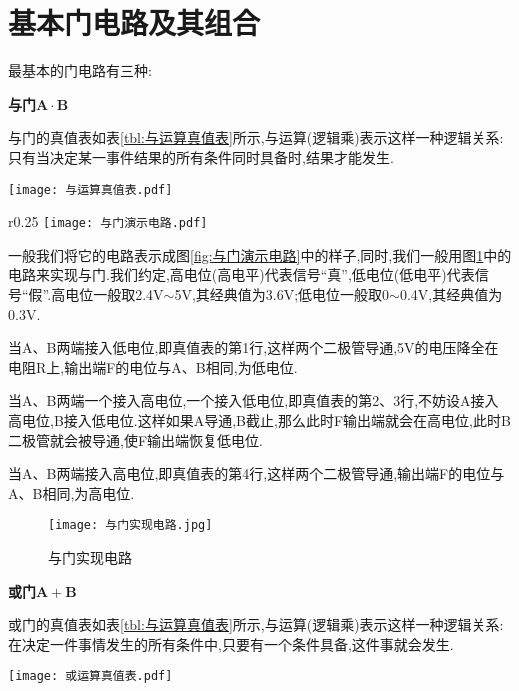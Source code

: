 \section{\K 基本门电路及其组合}
\Par 最基本的门电路有三种:

    \textbf{与门}$\boldsymbol{A}\cdot \boldsymbol{B}$
    
    \Par 与门的真值表如表\ref{tbl:与运算真值表}所示,与运算(逻辑乘)表示这样一种逻辑关系:只有当决定某一事件结果的所有条件同时具备时,结果才能发生.

    \begin{table}[htbp]
        \centering
        \caption{与运算真值表}
        \texttt{[image: 与运算真值表.pdf]}
        \label{tbl:与运算真值表}
    \end{table}

    \begin{wrapfigure}[5]{r}{0.25\textwidth}
        \centering
        \texttt{[image: 与门演示电路.pdf]}
        \caption{与门演示电路}
        \label{fig:与门演示电路}
    \end{wrapfigure}
    \Par 一般我们将它的电路表示成图\ref{fig:与门演示电路}中的样子,同时,我们一般用图\ref{fig:与门实现电路}中的电路来实现与门.我们约定,高电位(高电平)代表信号“真”,低电位(低电平)代表信号“假”.高电位一般取2.4V$\sim$5V,其经典值为3.6V;低电位一般取0$\sim$0.4V,其经典值为0.3V.

    \Par 当A、B两端接入低电位,即真值表的第1行,这样两个二极管导通,5V的电压降全在电阻R上,输出端F的电位与A、B相同,为低电位.

    \Par 当A、B两端一个接入高电位,一个接入低电位,即真值表的第2、3行,不妨设A接入高电位,B接入低电位.这样如果A导通,B截止,那么此时F输出端就会在高电位,此时B二极管就会被导通,使F输出端恢复低电位.

    \Par 当A、B两端接入高电位,即真值表的第4行,这样两个二极管导通,输出端F的电位与A、B相同,为高电位.
    \begin{figure}[htbp]
        \centering
        \texttt{[image: 与门实现电路.jpg]}
        \caption{与门实现电路}
        \label{fig:与门实现电路}
    \end{figure}

    \textbf{或门}$\boldsymbol{A}+\boldsymbol{B}$

    \Par 或门的真值表如表\ref{tbl:与运算真值表}所示,与运算(逻辑乘)表示这样一种逻辑关系:在决定一件事情发生的所有条件中,只要有一个条件具备,这件事就会发生.

    \begin{table}[htbp]
        \centering
        \caption{或运算真值表}
        \texttt{[image: 或运算真值表.pdf]}
        \label{tbl:或运算真值表}
    \end{table}
    
